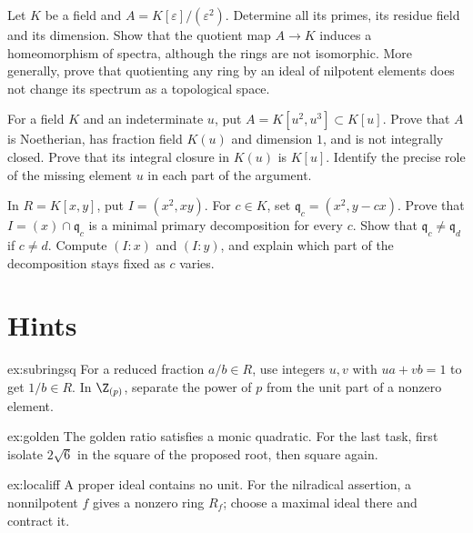 \begin{exercise}[$\star\star$]\label{ex:v10new-ch05-dual}
Let $K$ be a field and $A=K[\varepsilon]/(\varepsilon^2)$. Determine all its primes, its residue field and its dimension. Show that the quotient map $A\to K$ induces a homeomorphism of spectra, although the rings are not isomorphic. More generally, prove that quotienting any ring by an ideal of nilpotent elements does not change its spectrum as a topological space.
\end{exercise}

\begin{exercise}[$\star\star$]\label{ex:v10new-ch05-cusp}
For a field $K$ and an indeterminate $u$, put $A=K[u^2,u^3]\subset K[u]$. Prove that $A$ is Noetherian, has fraction field $K(u)$ and dimension $1$, and is not integrally closed. Prove that its integral closure in $K(u)$ is $K[u]$. Identify the precise role of the missing element $u$ in each part of the argument.
\end{exercise}

\begin{exercise}[$\star\star\star$]\label{ex:v10new-ch05-embedded}
In $R=K[x,y]$, put $I=(x^2,xy)$. For $c\in K$, set $\mathfrak q_c=(x^2,y-cx)$. Prove that $I=(x)\cap\mathfrak q_c$ is a minimal primary decomposition for every $c$. Show that $\mathfrak q_c\ne\mathfrak q_d$ if $c\ne d$. Compute $(I:x)$ and $(I:y)$, and explain which part of the decomposition stays fixed as $c$ varies.
\end{exercise}

\section{Hints}

\begin{hint}{ex:subringsq}
For a reduced fraction $a/b\in R$, use integers $u,v$ with $ua+vb=1$ to get $1/b\in R$. In $\Z_{(p)}$, separate the power of $p$ from the unit part of a nonzero element.
\end{hint}

\begin{hint}{ex:golden}
The golden ratio satisfies a monic quadratic. For the last task, first isolate $2\sqrt6$ in the square of the proposed root, then square again.
\end{hint}

\begin{hint}{ex:localiff}
A proper ideal contains no unit. For the nilradical assertion, a nonnilpotent $f$ gives a nonzero ring $R_f$; choose a maximal ideal there and contract it.
\end{hint}

